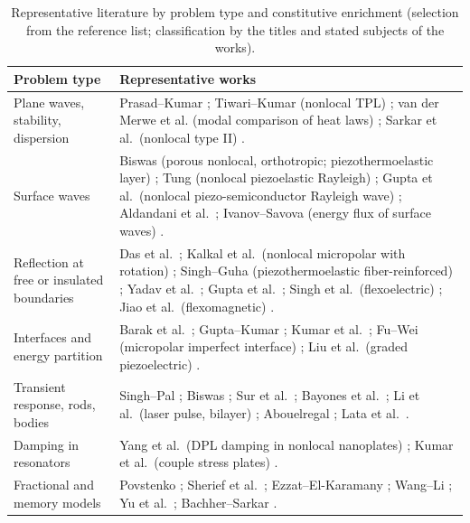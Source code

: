 \begin{table}[t]\centering\small
\caption{Representative literature by problem type and constitutive enrichment (selection from the reference list; classification by the titles and stated subjects of the works).}\label{tab:streams}
\begin{tabularx}{\textwidth}{@{}p{3.2cm}X@{}}\toprule
Problem type & Representative works\\\midrule
Plane waves, stability, dispersion & Prasad--Kumar \citep{Prasad2020}; Tiwari--Kumar (nonlocal TPL) \citep{Tiwari2021}; van der Merwe et al. (modal comparison of heat laws) \citep{vanDerMerwe2021}; Sarkar et al.\ (nonlocal type II) \citep{Sarkar2019}.\\
Surface waves & Biswas (porous nonlocal, orthotropic; piezothermoelastic layer) \citep{Biswas2020a,Biswas2020}; Tung (nonlocal piezoelastic Rayleigh) \citep{Tung2019}; Gupta et al.\ (nonlocal piezo-semiconductor Rayleigh wave) \citep{Gupta2024}; Aldandani et al.\ \citep{Aldandani2026}; Ivanov--Savova (energy flux of surface waves) \citep{IvanovSavova1991}.\\
Reflection at free or insulated boundaries & Das et al.\ \citep{Das2008}; Kalkal et al.\ (nonlocal micropolar with rotation) \citep{Kalkal2020}; Singh--Guha (piezothermoelastic fiber-reinforced) \citep{Singh2020b}; Yadav et al.\ \citep{Yadav2023}; Gupta et al.\ \citep{Gupta2024a}; Singh et al.\ (flexoelectric) \citep{Singh2020c}; Jiao et al.\ (flexomagnetic) \citep{Jiao2024}.\\
Interfaces and energy partition & Barak et al.\ \citep{Barak2023,Barak2023IJP,Barak2023JTS,Barak2023MMMS}; Gupta--Kumar \citep{Gupta2023IJNMF,Gupta2023Energy}; Kumar et al.\ \citep{Kumar2023PhysScr,Kumar2019,Kumar2022,Kumar2024,Kumar2024a,Kumar2025,KumarKansal2017,Kumar2018}; Fu--Wei (micropolar imperfect interface) \citep{Fu2013}; Liu et al.\ (graded piezoelectric) \citep{Liu2020}.\\
Transient response, rods, bodies & Singh--Pal \citep{Singh2019,Singh2020a}; Biswas \citep{Biswas2019}; Sur et al.\ \citep{Sur2019,Sur2025}; Bayones et al.\ \citep{Bayones2021}; Li et al.\ (laser pulse, bilayer) \citep{Li2019}; Abouelregal \citep{Abouelregal2023,Abouelregal2020,Abouelregal2020a}; Lata et al.\ \citep{Lata2020}.\\
Damping in resonators & Yang et al.\ (DPL damping in nonlocal nanoplates) \citep{Yang2021}; Kumar et al.\ (couple stress plates) \citep{Kumar2017}.\\
Fractional and memory models & Povstenko \citep{Povstenko2004,Povstenko2009,Povstenko2011Cattaneo,Povstenko2016}; Sherief et al.\ \citep{Sherief2010Fractional}; Ezzat--El-Karamany \citep{Ezzat2011}; Wang--Li \citep{Wang2011,Wang2021,WangLi2025IV}; Yu et al.\ \citep{Yu2024}; Bachher--Sarkar \citep{Bachher2019}.\\

\end{tabularx}
\end{table}
